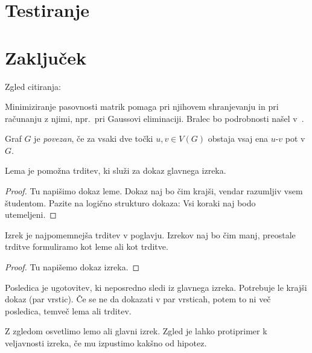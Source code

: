 \documentclass[12pt,a4paper,titlepage,openany]{report}
\begin{document}
\chapter{Testiranje}
\thispagestyle{fancy}

\chapter{Zaključek}
\thispagestyle{fancy}





\medskip
\noindent Zgled citiranja:

\medskip
Minimiziranje pasovnosti matrik pomaga pri njihovem shranjevanju in pri računanju z njimi, npr.~pri Gaussovi eliminaciji. Bralec bo podrobnosti našel v~\cite{Chinn, George, Strang}.


\begin{defi}
Graf $G$ je {\em povezan}, če za vsaki dve točki $u,v\in V(G)$ obstaja vsaj ena $u$-$v$ pot v $G$.
\end{defi}

\begin{lema}
Lema je pomožna trditev, ki služi za dokaz glavnega izreka.
\end{lema}

\begin{proof}
Tu napišimo dokaz leme. Dokaz naj bo čim krajši, vendar razumljiv vsem študentom. Pazite na logično strukturo dokaza: Vsi koraki naj bodo utemeljeni.
\end{proof}

\begin{izr}
Izrek je najpomemnejša trditev v poglavju. Izrekov naj bo čim manj, preostale trditve formuliramo kot leme ali kot trditve.
\end{izr}

\begin{proof}
Tu napišemo dokaz izreka.
\end{proof}

\begin{posl}
Posledica je ugotovitev, ki neposredno sledi iz glavnega izreka. Potrebuje le krajši dokaz (par vrstic). Če se ne da dokazati v par vrsticah, potem to ni več posledica, temveč lema ali trditev.
\end{posl}

\begin{prim}
Z zgledom osvetlimo lemo ali glavni izrek. Zgled je lahko protiprimer k veljavnosti izreka, če mu izpustimo kakšno od hipotez.
\end{prim}
\end{document}
